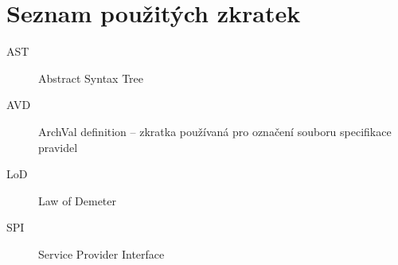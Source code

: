 \chapter{Seznam použitých zkratek}

\begin{description}
\item[AST] Abstract Syntax Tree
\item[AVD] ArchVal definition -- zkratka používaná pro označení souboru specifikace pravidel
\item[LoD] Law of Demeter
\item[SPI] Service Provider Interface
\end{description}
